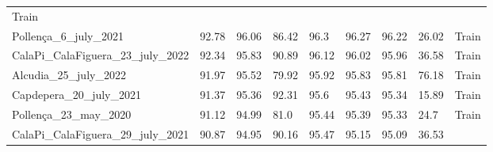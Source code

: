 \begin{table}[H]
{\begin{tabular}{lllllllll}
            {\color[HTML]{66c2a5} Train}
            \\
            Pollença\_6\_july\_2021                & 92.78               &
            96.06
                                                   & 86.42               & 96.3
                                                   & 96.27               &
            96.22
                                                   & 26.02               &
            {\color[HTML]{66c2a5} Train}
            \\
            CalaPi\_CalaFiguera\_23\_july\_2022    & 92.34               &
            95.83
                                                   & 90.89               &
            96.12
                                                   & 96.02               &
            95.96
                                                   & 36.58               &
            {\color[HTML]{66c2a5} Train}
            \\
            Alcudia\_25\_july\_2022                & 91.97               &
            95.52
                                                   & 79.92               &
            95.92
                                                   & 95.83               &
            95.81
                                                   & 76.18               &
            {\color[HTML]{66c2a5} Train}
            \\
            Capdepera\_20\_july\_2021              & 91.37               &
            95.36
                                                   & 92.31               & 95.6
                                                   & 95.43               &
            95.34
                                                   & 15.89               &
            {\color[HTML]{66c2a5} Train}
            \\
            Pollença\_23\_may\_2020                & 91.12               &
            94.99
                                                   & 81.0                &
            95.44
                                                   & 95.39               &
            95.33
                                                   & 24.7                &
            {\color[HTML]{66c2a5} Train}
            \\
            CalaPi\_CalaFiguera\_29\_july\_2021    & 90.87               &
            94.95
                                                   & 90.16               &
            95.47
                                                   & 95.15               &
            95.09
                                                   & 36.53               &

\end{tabular}}
\end{table}
